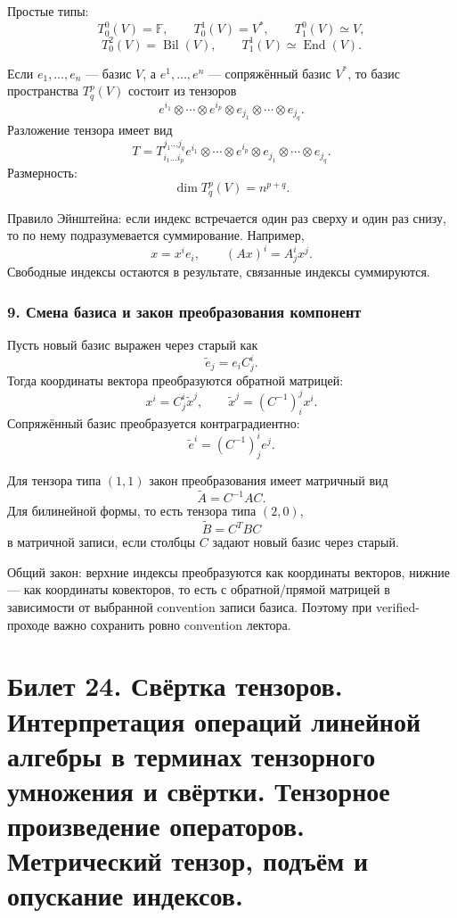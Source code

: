 \documentclass[12pt,a4paper]{article}
\theoremstyle{definition}
\theoremstyle{plain}
\theoremstyle{remark}
\newcommand{\F}{\mathbb{F}}
\newcommand{\End}{\operatorname{End}}
\begin{document}
Простые типы:
\[
    T^0_0(V)=\F,
    \qquad
    T^1_0(V)=V^*,
    \qquad
    T^0_1(V)\simeq V,
\]
\[
    T^2_0(V)=\operatorname{Bil}(V),
    \qquad
    T^1_1(V)\simeq \End(V).
\]

Если $e_1,\ldots,e_n$ --- базис $V$, а $e^1,\ldots,e^n$ --- сопряжённый базис $V^*$, то базис пространства $T^p_q(V)$ состоит из тензоров
\[
    e^{i_1}\otimes\cdots\otimes e^{i_p}\otimes e_{j_1}\otimes\cdots\otimes e_{j_q}.
\]
Разложение тензора имеет вид
\[
    T=T^{j_1\ldots j_q}_{i_1\ldots i_p}
      e^{i_1}\otimes\cdots\otimes e^{i_p}\otimes e_{j_1}\otimes\cdots\otimes e_{j_q}.
\]
Размерность:
\[
    \dim T^p_q(V)=n^{p+q}.
\]

Правило Эйнштейна: если индекс встречается один раз сверху и один раз снизу, то по нему подразумевается суммирование.
Например,
\[
    x=x^i e_i,
    \qquad
    (Ax)^i=A^i_j x^j.
\]
Свободные индексы остаются в результате, связанные индексы суммируются.

\subsubsection*{9. Смена базиса и закон преобразования компонент}
Пусть новый базис выражен через старый как
\[
    \tilde e_j=e_i C^i_j.
\]
Тогда координаты вектора преобразуются обратной матрицей:
\[
    x^i=C^i_j\tilde x^j,
    \qquad
    \tilde x^j=(C^{-1})^j_i x^i.
\]
Сопряжённый базис преобразуется контраградиентно:
\[
    \tilde e^i=(C^{-1})^i_j e^j.
\]

Для тензора типа $(1,1)$ закон преобразования имеет матричный вид
\[
    \tilde A=C^{-1}AC.
\]
Для билинейной формы, то есть тензора типа $(2,0)$,
\[
    \tilde B=C^TBC
\]
в матричной записи, если столбцы $C$ задают новый базис через старый.

Общий закон: верхние индексы преобразуются как координаты векторов, нижние --- как координаты ковекторов, то есть с обратной/прямой матрицей в зависимости от выбранной convention записи базиса. Поэтому при verified-проходе важно сохранить ровно convention лектора.

\clearpage

\section{Билет 24. Свёртка тензоров. Интерпретация операций линейной алгебры в терминах тензорного умножения и свёртки. Тензорное произведение операторов. Метрический тензор, подъём и опускание индексов.}
\end{document}
